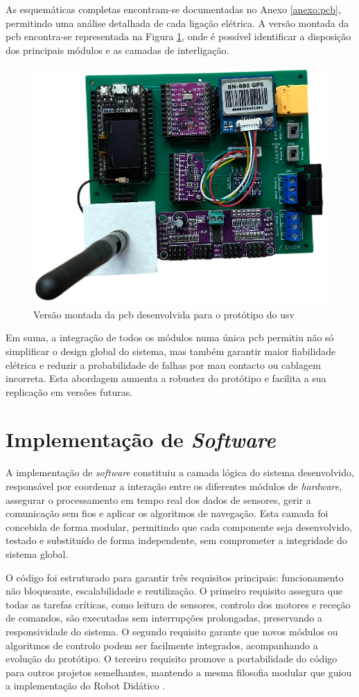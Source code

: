 As esquemáticas completas encontram-se documentadas no Anexo \ref{anexo:pcb}, permitindo uma análise detalhada de cada ligação elétrica. A versão montada da \gls{pcb} encontra-se representada na Figura \ref{fig:pcb-final}, onde é possível identificar a disposição dos principais módulos e as camadas de interligação.  

\begin{figure}[H]
    \centering
    \includegraphics[width=0.5\linewidth]{figuras/pcb-final.png}
    \caption{Versão montada da \gls{pcb} desenvolvida para o protótipo do \gls{usv}}
    \label{fig:pcb-final}
\end{figure}

Em suma, a integração de todos os módulos numa única \gls{pcb} permitiu não só simplificar o design global do sistema, mas também garantir maior fiabilidade elétrica e reduzir a probabilidade de falhas por mau contacto ou cablagem incorreta. Esta abordagem aumenta a robustez do protótipo e facilita a sua replicação em versões futuras.

\section{Implementação de \emph{Software}}
\label{sec:implementacao-software}

A implementação de \emph{software} constituiu a camada lógica do sistema desenvolvido, responsável por coordenar a interação entre os diferentes módulos de \emph{hardware}, assegurar o processamento em tempo real dos dados de sensores, gerir a comunicação sem fios e aplicar os algoritmos de navegação. Esta camada foi concebida de forma modular, permitindo que cada componente seja desenvolvido, testado e substituído de forma independente, sem comprometer a integridade do sistema global.  

O código foi estruturado para garantir três requisitos principais: funcionamento não bloqueante, escalabilidade e reutilização. O primeiro requisito assegura que todas as tarefas críticas, como leitura de sensores, controlo dos motores e receção de comandos, são executadas sem interrupções prolongadas, preservando a responsividade do sistema. O segundo requisito garante que novos módulos ou algoritmos de controlo podem ser facilmente integrados, acompanhando a evolução do protótipo. O terceiro requisito promove a portabilidade do código para outros projetos semelhantes, mantendo a mesma filosofia modular que guiou a implementação do Robot Didático \cite{didactic-robot-thesis}.  

